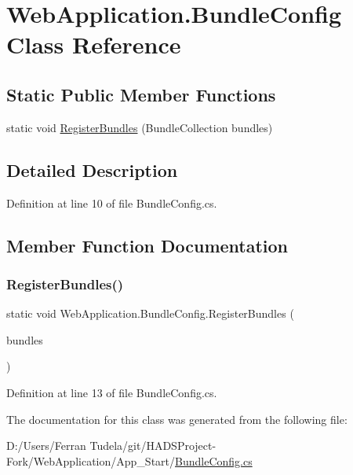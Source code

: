 \hypertarget{classWebApplication_1_1BundleConfig}{}\section{Web\+Application.\+Bundle\+Config Class Reference}
\label{classWebApplication_1_1BundleConfig}
\subsection*{Static Public Member Functions}
\begin{DoxyCompactItemize}
\item 
static void \mbox{\hyperlink{classWebApplication_1_1BundleConfig_ae7996f334a178306dd44a72beebc2494}{Register\+Bundles}} (Bundle\+Collection bundles)
\end{DoxyCompactItemize}


\subsection{Detailed Description}


Definition at line 10 of file Bundle\+Config.\+cs.



\subsection{Member Function Documentation}
\mbox{\label{classWebApplication_1_1BundleConfig_ae7996f334a178306dd44a72beebc2494}} 
\subsubsection{\texorpdfstring{RegisterBundles()}{RegisterBundles()}}
{\footnotesize\ttfamily static void Web\+Application.\+Bundle\+Config.\+Register\+Bundles (\begin{DoxyParamCaption}\item[{Bundle\+Collection}]{bundles }\end{DoxyParamCaption})\hspace{0.3cm}{\ttfamily [static]}}



Definition at line 13 of file Bundle\+Config.\+cs.



The documentation for this class was generated from the following file\+:\begin{DoxyCompactItemize}
\item 
D\+:/\+Users/\+Ferran Tudela/git/\+H\+A\+D\+S\+Project-\/\+Fork/\+Web\+Application/\+App\+\_\+\+Start/\mbox{\hyperlink{BundleConfig_8cs}{Bundle\+Config.\+cs}}\end{DoxyCompactItemize}
